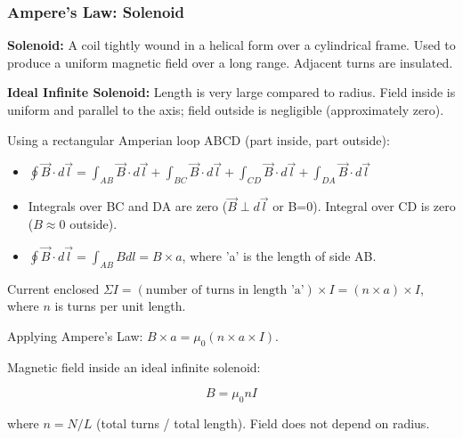 \transfade[duration=0.5]

\begin{frame}[t]
    \frametitle{\textcolor{deepnavy}{\textbf{Ampere's Law: Solenoid}}}
    \renewcommand{\familydefault}{\rmdefault}
    \small

      \item<+-> \textbf{Solenoid:} A coil tightly wound in a helical form over a cylindrical frame.   Used to produce a uniform magnetic field over a long range.   Adjacent turns are insulated.

      \item<+-> \textbf{Ideal Infinite Solenoid:} Length is very large compared to radius.   Field inside is uniform and parallel to the axis; field outside is negligible (approximately zero).
      \item<+-> Using a rectangular Amperian loop ABCD (part inside, part outside):
        \begin{itemize}
              \item $\oint \vec{B} \cdot d\vec{l} = \int_{AB} \vec{B} \cdot d\vec{l} + \int_{BC} \vec{B} \cdot d\vec{l} + \int_{CD} \vec{B} \cdot d\vec{l} + \int_{DA} \vec{B} \cdot d\vec{l}$
              \item Integrals over BC and DA are zero ($\vec{B} \perp d\vec{l}$ or B=0).   Integral over CD is zero ($B \approx 0$ outside).
              \item $\oint \vec{B} \cdot d\vec{l} = \int_{AB} B dl = B \times a$, where 'a' is the length of side AB.
        \end{itemize}
      \item<+-> Current enclosed $\Sigma I = (\text{number of turns in length 'a'}) \times I = (n \times a) \times I$, where $n$ is turns per unit length.
      \item<+-> Applying Ampere's Law: $B \times a = \mu_0 (n \times a \times I)$.
    \item<+-> Magnetic field inside an ideal infinite solenoid:
        \begin{tcolorbox}[colback=blue!5,colframe=blue!80,boxrule=0.5pt,arc=1mm,boxsep=1pt]
        \begin{equation*}
             B = \mu_0 n I
        \end{equation*}
        \end{tcolorbox}
          where $n = N/L$ (total turns / total length).   Field does not depend on radius.
\end{frame}

